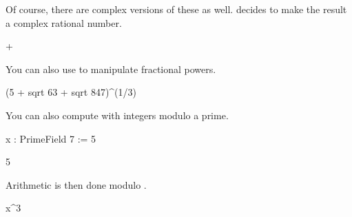 {{{{{{{{\begin{xtc}
\end{xtc}
\begin{xtc}
\begin{xtccomment}
Of course, there are complex versions of these as well.
\Language{} decides to make the result a complex rational number.
\end{xtccomment}
\begin{spadsrc}
\end{spadsrc}
\begin{TeXOutput}
\begin{fricasmath}{23}
+\TIMES \ImaginaryI %
\end{fricasmath}
\end{TeXOutput}
\end{xtc}
\begin{xtc}
\begin{xtccomment}
You can also use \Language{} to manipulate fractional powers.
\end{xtccomment}
\begin{spadsrc}
(5 + sqrt 63 + sqrt 847)^(1/3)
\end{spadsrc}
\begin{TeXOutput}
\begin{fricasmath}{24}
%
\end{fricasmath}
\end{TeXOutput}
\end{xtc}
\begin{xtc}
\begin{xtccomment}
You can also compute with integers modulo a prime.
\end{xtccomment}
\begin{spadsrc}
x : PrimeField 7 := 5 
\end{spadsrc}
\begin{TeXOutput}
\begin{fricasmath}{25}
5%
\end{fricasmath}
\end{TeXOutput}
\end{xtc}
\begin{xtc}
\begin{xtccomment}
Arithmetic is then done modulo .
\end{xtccomment}
\begin{spadsrc}
x^3 
\end{spadsrc}

\end{xtc}}}}}}}}}
